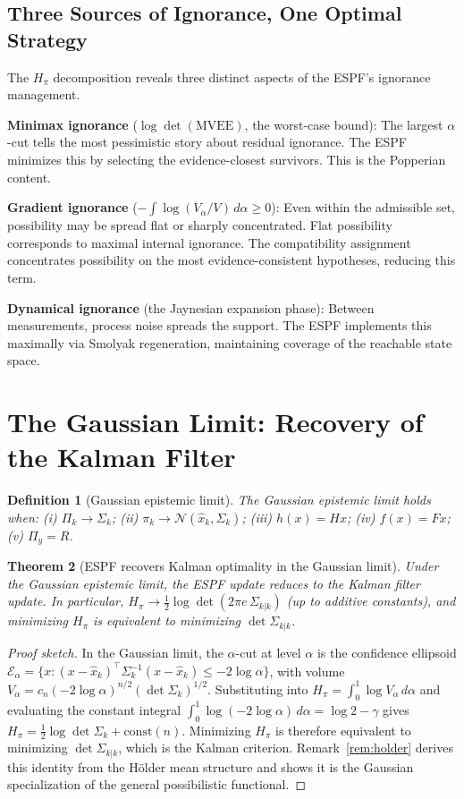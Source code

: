 \documentclass[12pt]{article}
\newtheorem{theorem}{Theorem}[section]
\newtheorem{definition}[theorem]{Definition}
\begin{document}
\subsection{Three Sources of Ignorance, One Optimal Strategy}

The $H_\pi$ decomposition reveals three distinct aspects of the ESPF's ignorance management.

\textbf{Minimax ignorance} ($\log\det(\mathrm{MVEE})$, the worst-case bound): The largest $\alpha$-cut tells the most pessimistic story about residual ignorance. The ESPF minimizes this by selecting the evidence-closest survivors. This is the Popperian content.

\textbf{Gradient ignorance} ($-\int\log(V_\alpha/V)\,d\alpha \geq 0$): Even within the admissible set, possibility may be spread flat or sharply concentrated. Flat possibility corresponds to maximal internal ignorance. The compatibility assignment concentrates possibility on the most evidence-consistent hypotheses, reducing this term.

\textbf{Dynamical ignorance} (the Jaynesian expansion phase): Between measurements, process noise spreads the support. The ESPF implements this maximally via Smolyak regeneration, maintaining coverage of the reachable state space.

\section{The Gaussian Limit: Recovery of the Kalman Filter}
\label{sec:gaussian}

\begin{definition}[Gaussian epistemic limit]
The Gaussian epistemic limit holds when: (i) $\Pi_k \to \Sigma_k$; (ii) $\pi_k \to \mathcal{N}(\hat{x}_k, \Sigma_k)$; (iii) $h(x) = Hx$; (iv) $f(x) = Fx$; (v) $\Pi_y = R$.
\end{definition}

\begin{theorem}[ESPF recovers Kalman optimality in the Gaussian limit]
Under the Gaussian epistemic limit, the ESPF update reduces to the Kalman filter update. In particular, $H_\pi \to \frac{1}{2}\log\det(2\pi e\,\Sigma_{k|k})$ (up to additive constants), and minimizing $H_\pi$ is equivalent to minimizing $\det\Sigma_{k|k}$.
\end{theorem}

\begin{proof}[Proof sketch]
In the Gaussian limit, the $\alpha$-cut at level $\alpha$ is the confidence ellipsoid $\mathcal{E}_\alpha = \{x : (x-\hat{x}_k)^\top\Sigma_k^{-1}(x-\hat{x}_k) \leq -2\log\alpha\}$, with volume $V_\alpha = c_n(-2\log\alpha)^{n/2}(\det\Sigma_k)^{1/2}$. Substituting into $H_\pi = \int_0^1\log V_\alpha\,d\alpha$ and evaluating the constant integral $\int_0^1\log(-2\log\alpha)\,d\alpha = \log 2 - \gamma$ gives $H_\pi = \frac{1}{2}\log\det\Sigma_k + \mathrm{const}(n)$. Minimizing $H_\pi$ is therefore equivalent to minimizing $\det\Sigma_{k|k}$, which is the Kalman criterion. Remark~\ref{rem:holder} derives this identity from the H\"{o}lder mean structure and shows it is the Gaussian specialization of the general possibilistic functional.
\end{proof}
\end{document}
